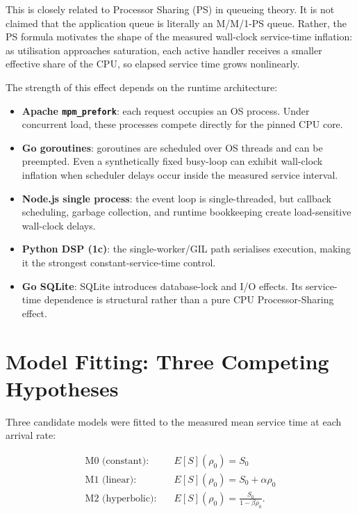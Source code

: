 This is closely related to Processor Sharing (PS) in queueing theory. It is not claimed that the application queue is literally an M/M/1-PS queue. Rather, the PS formula motivates the shape of the measured wall-clock service-time inflation: as utilisation approaches saturation, each active handler receives a smaller effective share of the CPU, so elapsed service time grows nonlinearly.

The strength of this effect depends on the runtime architecture:

\begin{itemize}
    \item \textbf{Apache \texttt{mpm\_prefork}}: each request occupies an OS process. Under concurrent load, these processes compete directly for the pinned CPU core.
    \item \textbf{Go goroutines}: goroutines are scheduled over OS threads and can be preempted. Even a synthetically fixed busy-loop can exhibit wall-clock inflation when scheduler delays occur inside the measured service interval.
    \item \textbf{Node.js single process}: the event loop is single-threaded, but callback scheduling, garbage collection, and runtime bookkeeping create load-sensitive wall-clock delays.
    \item \textbf{Python DSP (1c)}: the single-worker/GIL path serialises execution, making it the strongest constant-service-time control.
    \item \textbf{Go SQLite}: SQLite introduces database-lock and I/O effects. Its service-time dependence is structural rather than a pure CPU Processor-Sharing effect.
\end{itemize}

\section{Model Fitting: Three Competing Hypotheses}
\label{sec:model-fitting}

Three candidate models were fitted to the measured mean service time at each arrival rate:

\begin{align}
    \text{M0 (constant):}   &\quad E[S](\rho_0) = S_0 \label{eq:m0} \\
    \text{M1 (linear):}     &\quad E[S](\rho_0) = S_0 + \alpha\rho_0 \label{eq:m1} \\
    \text{M2 (hyperbolic):} &\quad E[S](\rho_0) = \frac{S_0}{1 - \beta\rho_0}. \label{eq:m2}
\end{align}

